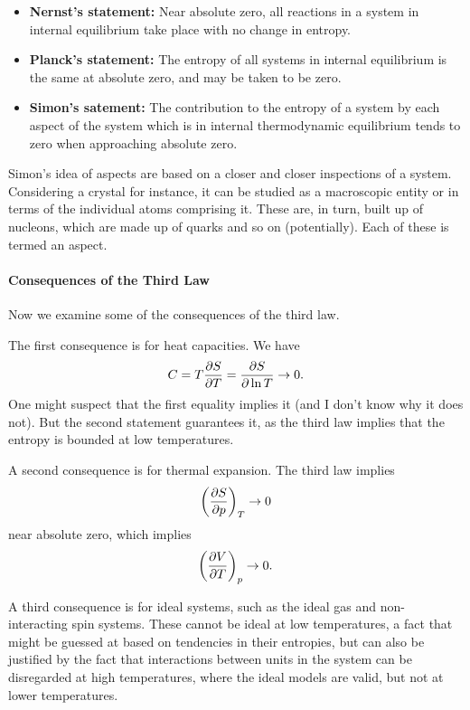 \begin{itemize}
	\item \textbf{Nernst's statement:} Near absolute zero, all reactions in a system in internal equilibrium take place with no change in entropy.
	\item \textbf{Planck's statement:} The entropy of all systems in internal equilibrium is the same at absolute zero, and may be taken to be zero.
	\item \textbf{Simon's satement:} The contribution to the entropy of a system by each aspect of the system which is in internal thermodynamic equilibrium tends to zero when approaching absolute zero.
\end{itemize}

Simon's idea of aspects are based on a closer and closer inspections of a system. Considering a crystal for instance, it can be studied as a macroscopic entity or in terms of the individual atoms comprising it. These are, in turn, built up of nucleons, which are made up of quarks and so on (potentially). Each of these is termed an aspect.

\paragraph{Consequences of the Third Law}
Now we examine some of the consequences of the third law.

The first consequence is for heat capacities. We have
\begin{align*}
	C = T\pdv{S}{T} = \pdv{S}{\ln{T}} \to 0.
\end{align*}
One might suspect that the first equality implies it (and I don't know why it does not). But the second statement guarantees it, as the third law implies that the entropy is bounded at low temperatures.

A second consequence is for thermal expansion. The third law implies
\begin{align*}
	\left(\pdv{S}{p}\right)_{T} \to 0
\end{align*}
near absolute zero, which implies
\begin{align*}
	\left(\pdv{V}{T}\right)_{p} \to 0.
\end{align*}

A third consequence is for ideal systems, such as the ideal gas and non-interacting spin systems. These cannot be ideal at low temperatures, a fact that might be guessed at based on tendencies in their entropies, but can also be justified by the fact that interactions between units in the system can be disregarded at high temperatures, where the ideal models are valid, but not at lower temperatures.

